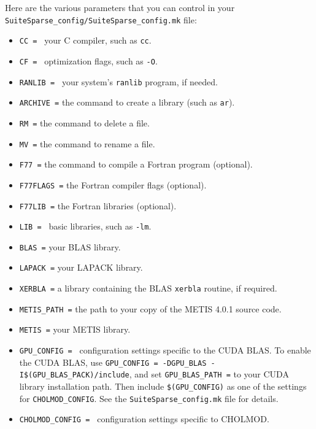 \documentclass[11pt]{article}
\begin{document}
\noindent
Here are the various parameters that you can control in your
{\tt SuiteSparse\_config/SuiteSparse\_config.mk} file:
\begin{itemize}
\item {\tt CC = } your C compiler, such as {\tt cc}.
\item {\tt CF = } optimization flags, such as {\tt -O}.
\item {\tt RANLIB = } your system's {\tt ranlib} program, if needed.
\item {\tt ARCHIVE =} the command to create a library (such as {\tt ar}).
\item {\tt RM =} the command to delete a file.
\item {\tt MV =} the command to rename a file.
\item {\tt F77 =} the command to compile a Fortran program (optional).
\item {\tt F77FLAGS =} the Fortran compiler flags (optional).
\item {\tt F77LIB =} the Fortran libraries (optional).
\item {\tt LIB = } basic libraries, such as {\tt -lm}.
\item {\tt BLAS =} your BLAS library.
\item {\tt LAPACK =} your LAPACK library.
\item {\tt XERBLA =} a library containing the BLAS {\tt xerbla} routine, if required.
\item {\tt METIS\_PATH =} the path to your copy of the METIS 4.0.1 source code.
\item {\tt METIS =} your METIS library.
\item {\tt GPU\_CONFIG = } configuration settings specific to the CUDA BLAS.
    To enable the CUDA BLAS, use {\tt GPU\_CONFIG = -DGPU\_BLAS
    -I\$(GPU\_BLAS\_PACK)/include}, and set
    {\tt GPU\_BLAS\_PATH =} to your CUDA library installation path.
    Then include {\tt \$(GPU\_CONFIG)} as one of the settings for
    {\tt CHOLMOD\_CONFIG}.  See the {\tt SuiteSparse\_config.mk}
    file for details.
\item {\tt CHOLMOD\_CONFIG = } configuration settings specific to CHOLMOD.
\end{itemize}
\end{document}
